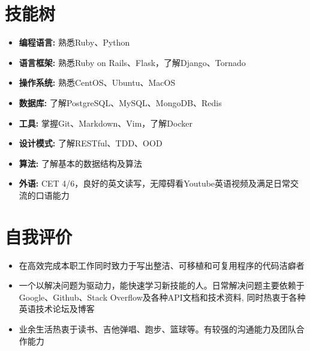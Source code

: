 \documentclass[11pt, a4paper,sans]{moderncv}     %
\begin{document}
    \section{\yahei 技能树}
    \begin{itemize}
        \item{\yahei \textbf{编程语言:} 熟悉Ruby、Python}
        \item{\yahei \textbf{语言框架:} 熟悉Ruby on Rails、Flask，了解Django、Tornado}
        \item{\yahei \textbf{操作系统:} 熟悉CentOS、Ubuntu、MacOS}
        \item{\yahei \textbf{数据库:} 了解PostgreSQL、MySQL、MongoDB、Redis}
        \item{\yahei \textbf{工具:} 掌握Git、Markdown、Vim，了解Docker}
        \item{\yahei \textbf{设计模式:} 了解RESTful、TDD、OOD}
        \item{\yahei \textbf{算法:} 了解基本的数据结构及算法}
        \item{\yahei \textbf{外语:} CET 4/6，良好的英文读写，无障碍看Youtube英语视频及满足日常交流的口语能力}
    \end{itemize}
    \vspace{-8pt}

    \section{\yahei 自我评价}

    \begin{itemize}
        \item{\yahei 在高效完成本职工作同时致力于写出整洁、可移植和可复用程序的代码洁癖者}
        \item{\yahei 一个以解决问题为驱动力，能快速学习新技能的人。日常解决问题主要依赖于Google、Github、Stack Overflow及各种API文档和技术资料, 同时热衷于各种英语技术论坛及博客}
        \item{\yahei 业余生活热衷于读书、吉他弹唱、跑步、篮球等。有较强的沟通能力及团队合作能力}
    \end{itemize}
\end{document}

